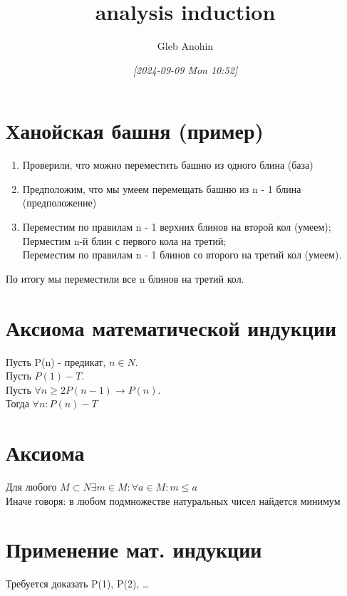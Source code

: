 \documentclass[letterpaper]{article}
\author{Gleb Anohin}
\date{\textit{{[}2024-09-09 Mon 10:52]}}
\title{analysis induction}
\begin{document}
\maketitle
\tableofcontents

\section{Ханойская башня (пример)}
\label{sec:org926daf0}
\begin{enumerate}
\item Проверили, что можно переместить башню из одного блина (база)\\
\item Предположим, что мы умеем перемещать башню из n - 1 блина (предположение)\\
\item Переместим по правилам n - 1 верхних блинов на второй кол (умеем);\\
Перместим n-й блин с первого кола на третий;\\
Переместим по правилам n - 1 блинов со второго на третий кол (умеем).\\
\end{enumerate}

По итогу мы переместили все n блинов на третий кол.\\
\section{Аксиома математической индукции}
\label{sec:org08ec334}
Пусть P(n) - предикат, \(n \in N\).\\

Пусть \(P(1) - T\).\\

Пусть \(\forall n \geq 2 P(n - 1) \rightarrow P(n)\).\\

Тогда \(\forall n: P(n) - T\)\\
\section{Аксиома}
\label{sec:orgd36cf32}
Для любого \(M \subset N \exists m \in M: \forall a \in M: m \leq a\)\\

Иначе говоря: в любом подмножестве натуральных чисел найдется минимум\\
\section{Применение мат. индукции}
\label{sec:orgc4f8bbc}
Требуется доказать P(1), P(2), \ldots{}\\
\end{document}
